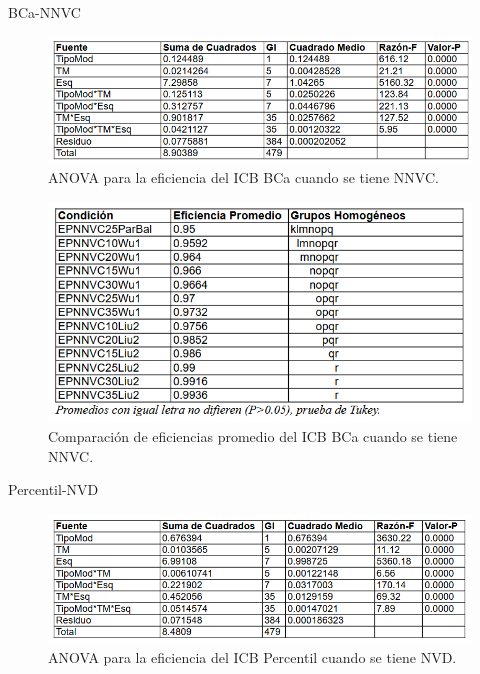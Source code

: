 BCa-NNVC

\begin{figure}[ht] 
	\centering 
	\includegraphics[width=0.95\linewidth]{img/ANOVA_Efic_ICB_BCa_NNVC.png} 
	\caption{ANOVA para la eficiencia del ICB BCa cuando se tiene NNVC.} 
	\label{fig:ANOVA_Efic_ICB_BCa_NNVC}
\end{figure}
\FloatBarrier


\begin{figure}[ht] 
	\centering 
	\includegraphics[width=0.76\linewidth]{img/CompEfic_PromICB_BCa_NNVC.png} 
	\caption{Comparación de eficiencias promedio del ICB BCa cuando se tiene NNVC.} 
	\label{fig:CompEfic_PromICB_BCa_NNVC}
\end{figure}
\FloatBarrier




Percentil-NVD

\begin{figure}[ht] 
	\centering 
	\includegraphics[width=0.95\linewidth]{img/ANOVA_Efic_ICB_Perc_NVD.png} 
	\caption{ANOVA para la eficiencia del ICB Percentil cuando se tiene NVD.} 
	\label{fig:ANOVA_Efic_ICB_Perc_NVD}
\end{figure}
\FloatBarrier


